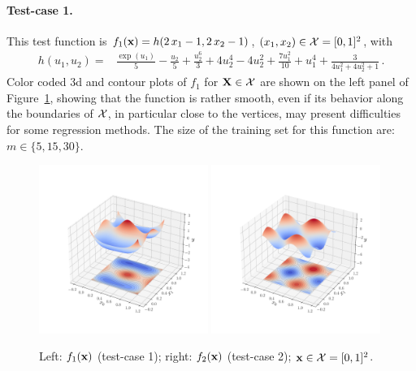 \paragraph{Test-case 1.}

This test function is $f_1({\bf x}) = h(2\,x_1 - 1, 2\,x_2 - 1)$, $(x_1,x_2) \in \mathcal{X}=[0,1]^2$, with
\begin{align*}
  h(u_1, u_2) =& \frac{\exp(u_1)}{5} - \frac{u_2}{5} + \frac{u_2^6}{3} + 4 u_2^4 - 4 u_2^2 + \frac{7u_1^2}{10} + u_1^4 + \frac{3}{4 u_1^2 + 4 u_2^2 + 1}\,. %
\end{align*}
Color coded 3d and contour plots of $f_1$ for ${\bf X}\in\mathcal{X}$ are shown on the left panel of Figure~\ref{fig:f1&f2}, showing that 
the function is rather smooth, even if its behavior along the boundaries of $\mathcal{X}$, in particular close to the vertices, may present difficulties for some regression methods. 
The size of the training set for this function are: $m\in\{5, 15, 30\}$.


\begin{figure}
  \centering
  \includegraphics[width=0.49\textwidth]{./part2/figures/SIS/irregular_function3D.pdf}
    \includegraphics[width=0.49\textwidth]{./part2/figures/SIS/cosin2_function3D.pdf}
  \caption{Left: $f_1({\bf x})$ (test-case 1); right: $f_2({\bf x})$ (test-case 2); ${\bf x}\in\mathcal{X}=[0,1]^2$.} 
  \label{fig:f1&f2}
\end{figure}

